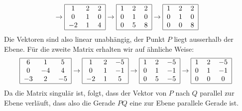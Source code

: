 \begin{loesung}
\begin{align*}
&\rightarrow
\begin{tabular}{|ccc|}
\hline
1&2&2\\
0&1&0\\
$-2$&1&4\\
\hline
\end{tabular}
\rightarrow
\begin{tabular}{|ccc|}
\hline
1&2&2\\
0&1&0\\
0&5&8\\
\hline
\end{tabular}
\rightarrow
\begin{tabular}{|ccc|}
\hline
1&2&2\\
0&1&0\\
0&0&8\\
\hline
\end{tabular}
\end{align*}
Die Vektoren sind also linear unabhängig, der Punkt $P$ liegt ausserhalb
der Ebene. Für die zweite Matrix erhalten wir auf ähnliche Weise:
\begin{align*}
\begin{tabular}{|ccc|}
\hline
6&1&5\\
0&$-4$&4\\
$-3$&2&$-5$\\
\hline
\end{tabular}
&\rightarrow
\begin{tabular}{|ccc|}
\hline
1&2&$-5$\\
0&1&$-1$\\
$-2$&1&5\\
\hline
\end{tabular}
\rightarrow
\begin{tabular}{|ccc|}
\hline
1&2&$-5$\\
0&1&$-1$\\
0&5&$-5$\\
\hline
\end{tabular}
\rightarrow
\begin{tabular}{|ccc|}
\hline
1&2&$-5$\\
0&1&$-1$\\
0&0&0\\
\hline
\end{tabular}
\end{align*}
Da die Matrix singulär ist, folgt, dass der Vektor von $P$ nach $Q$ parallel
zur Ebene verläuft, dass also die Gerade $PQ$ eine zur Ebene parallele
Gerade ist.
\end{loesung}

